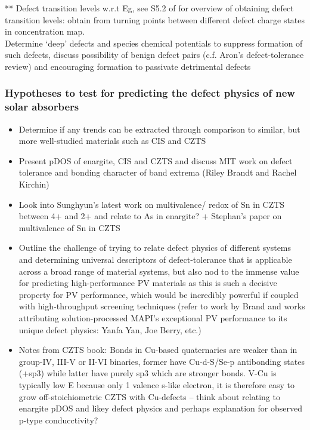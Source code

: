 \documentclass[11pt, twoside]{report}
\begin{document}
** Defect transition levels w.r.t Eg, see S5.2 of \cite{defects_Chen_large} for overview of obtaining defect transition levels: obtain from turning points between different defect charge states in concentration map.\\

Determine `deep' defects and species chemical potentials to suppress formation of such defects, discuss possibility of benign defect pairs (c.f. Aron's defect-tolerance review) and encouraging formation to passivate detrimental defects

\subsubsection{Hypotheses to test for predicting the defect physics of new solar absorbers}

\begin{itemize}
\item Determine if any trends can be extracted through comparison to similar, but more well-studied materials such as CIS and CZTS
\item Present pDOS of enargite, CIS and CZTS and discuss MIT work on defect tolerance and bonding character of band extrema (Riley Brandt and Rachel Kirchin)
\item Look into Sunghyun's latest work on multivalence/ redox of Sn in CZTS between 4+ and 2+ and relate to As in enargite? + Stephan's paper on multivalence of Sn in CZTS
\item Outline the challenge of trying to relate defect physics of different systems and determining universal descriptors of defect-tolerance that is applicable across a broad range of material systems, but also nod to the immense value for predicting high-performance PV materials as this is such a decisive property for PV performance, which would be incredibly powerful if coupled with high-throughput screening techniques (refer to work by Brand and works attributing solution-processed MAPI's exceptional PV performance to its unique defect physics: Yanfa Yan, Joe Berry, etc.)
\item Notes from CZTS book: Bonds in Cu-based quaternaries are weaker than in group-IV, III-V or II-VI binaries, former have Cu-d-S/Se-p antibonding states (+sp3) while latter have purely sp3 which are stronger bonds. V-Cu is typically low E because only 1 valence s-like electron, it is therefore easy to grow off-stoichiometric CZTS with Cu-defects -- think about relating to enargite pDOS and likey defect physics and perhaps explanation for observed p-type conducctivity?
\end{itemize}
\end{document}

